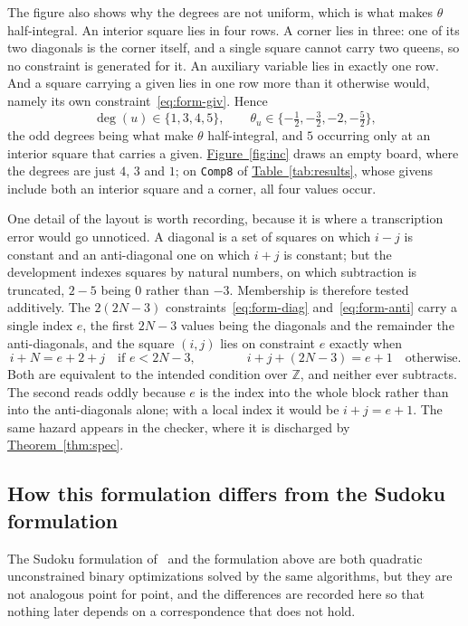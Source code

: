 \documentclass{easychair}
\newcommand{\citeref}[1]{\textcolor{academicpurple}{\cite{#1}}}
\newcommand{\thmref}[1]{\textcolor{academicpurple}{\hyperref[#1]{Theorem~\ref*{#1}}}}
\newcommand{\tabref}[1]{\textcolor{academicpurple}{\hyperref[#1]{Table~\ref*{#1}}}}
\newcommand{\figref}[1]{\textcolor{academicpurple}{\hyperref[#1]{Figure~\ref*{#1}}}}
\begin{document}
The figure also shows why the degrees are not uniform, which is what makes $\theta$ half-integral. An
interior square lies in four rows. A corner lies in three: one of its two diagonals is the corner
itself, and a single square cannot carry two queens, so no constraint is generated for it. An
auxiliary variable lies in exactly one row. And a square carrying a given lies in one row more than
it otherwise would, namely its own constraint~\eqref{eq:form-giv}. Hence
\begin{equation}\label{eq:degs}
  \deg(u) \in \{1,3,4,5\}, \qquad \theta_u \in \{-\tfrac12,-\tfrac32,-2,-\tfrac52\},
\end{equation}
the odd degrees being what make $\theta$ half-integral, and $5$ occurring only at an interior square
that carries a given. \figref{fig:inc} draws an empty board, where the degrees are just $4$, $3$ and
$1$; on \texttt{Comp8} of \tabref{tab:results}, whose givens include both an interior square and a
corner, all four values occur.

One detail of the layout is worth recording, because it is where a transcription error would go
unnoticed. A diagonal is a set of squares on which $i - j$ is constant and an anti-diagonal one on
which $i + j$ is constant; but the development indexes squares by natural numbers, on which
subtraction is truncated, $2 - 5$ being $0$ rather than $-3$. Membership is therefore tested
additively. The $2(2N-3)$ constraints~\eqref{eq:form-diag} and~\eqref{eq:form-anti} carry a single
index $e$, the first $2N-3$ values being the diagonals and the remainder the anti-diagonals, and the
square $(i,j)$ lies on constraint $e$ exactly when
\begin{equation}\label{eq:onslack}
  i + N = e + 2 + j \quad\text{if } e < 2N-3, \qquad\qquad
  i + j + (2N-3) = e + 1 \quad\text{otherwise.}
\end{equation}
Both are equivalent to the intended condition over $\mathbb{Z}$, and neither ever subtracts. The
second reads oddly because $e$ is the index into the whole block rather than into the anti-diagonals
alone; with a local index it would be $i + j = e + 1$. The same hazard appears in the checker, where
it is discharged by \thmref{thm:spec}.

\subsection{How this formulation differs from the Sudoku formulation}\label{sec:diff}

The Sudoku formulation of~\citeref{liwang2022} and the formulation above are both quadratic
unconstrained binary optimizations solved by the same algorithms, but they are not analogous point
for point, and the differences are recorded here so that nothing later depends on a correspondence
that does not hold.
\end{document}
